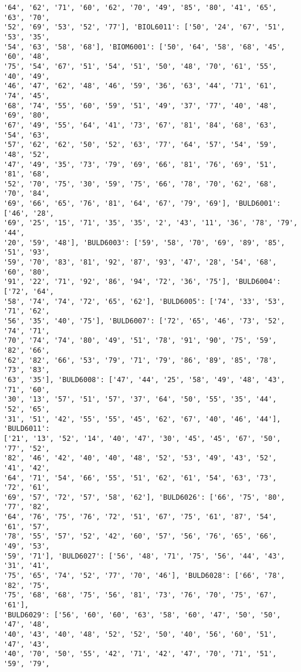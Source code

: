 \documentclass[11pt]{article}
\begin{document}
\begin{Verbatim}[commandchars=\\\{\}]
'64', '62', '71', '60', '62', '70', '49', '85', '80', '41', '65', '63', '70',
'52', '69', '53', '52', '77'], 'BIOL6011': ['50', '24', '67', '51', '53', '35',
'54', '63', '58', '68'], 'BIOM6001': ['50', '64', '58', '68', '45', '60', '48',
'75', '54', '67', '51', '54', '51', '50', '48', '70', '61', '55', '40', '49',
'46', '47', '62', '48', '46', '59', '36', '63', '44', '71', '61', '74', '45',
'68', '74', '55', '60', '59', '51', '49', '37', '77', '40', '48', '69', '80',
'67', '49', '55', '64', '41', '73', '67', '81', '84', '68', '63', '54', '63',
'57', '62', '62', '50', '52', '63', '77', '64', '57', '54', '59', '48', '52',
'47', '49', '35', '73', '79', '69', '66', '81', '76', '69', '51', '81', '68',
'52', '70', '75', '30', '59', '75', '66', '78', '70', '62', '68', '70', '84',
'69', '66', '65', '76', '81', '64', '67', '79', '69'], 'BULD6001': ['46', '28',
'69', '25', '15', '71', '35', '35', '2', '43', '11', '36', '78', '79', '44',
'20', '59', '48'], 'BULD6003': ['59', '58', '70', '69', '89', '85', '51', '93',
'59', '70', '83', '81', '92', '87', '93', '47', '28', '54', '68', '60', '80',
'91', '22', '71', '92', '86', '94', '72', '36', '75'], 'BULD6004': ['72', '64',
'58', '74', '74', '72', '65', '62'], 'BULD6005': ['74', '33', '53', '71', '62',
'56', '35', '40', '75'], 'BULD6007': ['72', '65', '46', '73', '52', '74', '71',
'70', '74', '74', '80', '49', '51', '78', '91', '90', '75', '59', '82', '66',
'62', '82', '66', '53', '79', '71', '79', '86', '89', '85', '78', '73', '83',
'63', '35'], 'BULD6008': ['47', '44', '25', '58', '49', '48', '43', '71', '60',
'30', '13', '57', '51', '57', '37', '64', '50', '55', '35', '44', '52', '65',
'31', '51', '42', '55', '55', '45', '62', '67', '40', '46', '44'], 'BULD6011':
['21', '13', '52', '14', '40', '47', '30', '45', '45', '67', '50', '77', '52',
'82', '46', '42', '40', '40', '48', '52', '53', '49', '43', '52', '41', '42',
'64', '71', '54', '66', '55', '51', '62', '61', '54', '63', '73', '72', '61',
'69', '57', '72', '57', '58', '62'], 'BULD6026': ['66', '75', '80', '77', '82',
'64', '76', '75', '76', '72', '51', '67', '75', '61', '87', '54', '61', '57',
'78', '55', '57', '52', '42', '60', '57', '56', '76', '65', '66', '49', '53',
'59', '71'], 'BULD6027': ['56', '48', '71', '75', '56', '44', '43', '31', '41',
'75', '65', '74', '52', '77', '70', '46'], 'BULD6028': ['66', '78', '82', '75',
'75', '68', '68', '75', '56', '81', '73', '76', '70', '75', '67', '61'],
'BULD6029': ['56', '60', '60', '63', '58', '60', '47', '50', '50', '47', '48',
'40', '43', '40', '48', '52', '52', '50', '40', '56', '60', '51', '47', '43',
'40', '70', '50', '55', '42', '71', '42', '47', '70', '71', '51', '59', '79',

\end{Verbatim}
\end{document}
